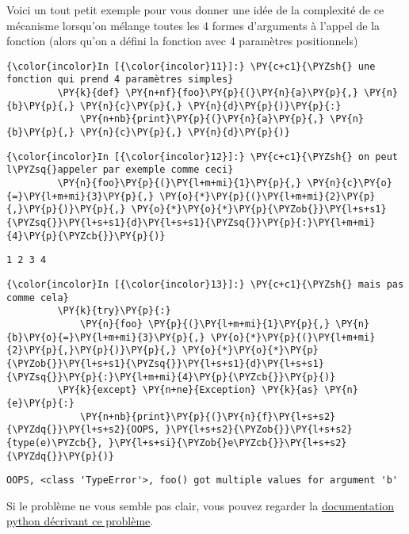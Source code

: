     Voici un tout petit exemple pour vous donner une idée de la complexité
de ce mécanisme lorsqu'on mélange toutes les 4 formes d'arguments à
l'appel de la fonction (alors qu'on a défini la fonction avec 4
paramètres positionnels)

    \begin{Verbatim}[commandchars=\\\{\}]
{\color{incolor}In [{\color{incolor}11}]:} \PY{c+c1}{\PYZsh{} une fonction qui prend 4 paramètres simples}
         \PY{k}{def} \PY{n+nf}{foo}\PY{p}{(}\PY{n}{a}\PY{p}{,} \PY{n}{b}\PY{p}{,} \PY{n}{c}\PY{p}{,} \PY{n}{d}\PY{p}{)}\PY{p}{:}
             \PY{n+nb}{print}\PY{p}{(}\PY{n}{a}\PY{p}{,} \PY{n}{b}\PY{p}{,} \PY{n}{c}\PY{p}{,} \PY{n}{d}\PY{p}{)}
\end{Verbatim}


    \begin{Verbatim}[commandchars=\\\{\}]
{\color{incolor}In [{\color{incolor}12}]:} \PY{c+c1}{\PYZsh{} on peut l\PYZsq{}appeler par exemple comme ceci}
         \PY{n}{foo}\PY{p}{(}\PY{l+m+mi}{1}\PY{p}{,} \PY{n}{c}\PY{o}{=}\PY{l+m+mi}{3}\PY{p}{,} \PY{o}{*}\PY{p}{(}\PY{l+m+mi}{2}\PY{p}{,}\PY{p}{)}\PY{p}{,} \PY{o}{*}\PY{o}{*}\PY{p}{\PYZob{}}\PY{l+s+s1}{\PYZsq{}}\PY{l+s+s1}{d}\PY{l+s+s1}{\PYZsq{}}\PY{p}{:}\PY{l+m+mi}{4}\PY{p}{\PYZcb{}}\PY{p}{)}
\end{Verbatim}


    \begin{Verbatim}[commandchars=\\\{\}]
1 2 3 4

    \end{Verbatim}

    \begin{Verbatim}[commandchars=\\\{\}]
{\color{incolor}In [{\color{incolor}13}]:} \PY{c+c1}{\PYZsh{} mais pas comme cela}
         \PY{k}{try}\PY{p}{:}
             \PY{n}{foo} \PY{p}{(}\PY{l+m+mi}{1}\PY{p}{,} \PY{n}{b}\PY{o}{=}\PY{l+m+mi}{3}\PY{p}{,} \PY{o}{*}\PY{p}{(}\PY{l+m+mi}{2}\PY{p}{,}\PY{p}{)}\PY{p}{,} \PY{o}{*}\PY{o}{*}\PY{p}{\PYZob{}}\PY{l+s+s1}{\PYZsq{}}\PY{l+s+s1}{d}\PY{l+s+s1}{\PYZsq{}}\PY{p}{:}\PY{l+m+mi}{4}\PY{p}{\PYZcb{}}\PY{p}{)}
         \PY{k}{except} \PY{n+ne}{Exception} \PY{k}{as} \PY{n}{e}\PY{p}{:}
             \PY{n+nb}{print}\PY{p}{(}\PY{n}{f}\PY{l+s+s2}{\PYZdq{}}\PY{l+s+s2}{OOPS, }\PY{l+s+s2}{\PYZob{}}\PY{l+s+s2}{type(e)\PYZcb{}, }\PY{l+s+si}{\PYZob{}e\PYZcb{}}\PY{l+s+s2}{\PYZdq{}}\PY{p}{)}
\end{Verbatim}


    \begin{Verbatim}[commandchars=\\\{\}]
OOPS, <class 'TypeError'>, foo() got multiple values for argument 'b'

    \end{Verbatim}

    Si le problème ne vous semble pas clair, vous pouvez regarder la
\href{https://docs.python.org/3/reference/expressions.html\#calls}{documentation
python décrivant ce problème}.